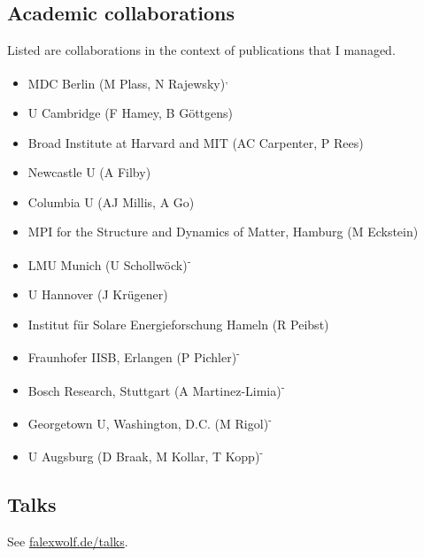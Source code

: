\subsection*{Academic collaborations}
Listed are collaborations in the context of publications that I managed. 
\begin{itemize}
\item MDC Berlin (M Plass, N Rajewsky)\textsuperscript{,}
\item U Cambridge (F Hamey, B Göttgens)
\item Broad Institute at Harvard and MIT (AC Carpenter, P Rees)
\item Newcastle U (A Filby)
\item Columbia U (AJ Millis, A Go)
\item MPI for the Structure and Dynamics of Matter, Hamburg (M Eckstein)
\item LMU Munich (U Schollwöck)\textsuperscript{-}
\item U Hannover (J Krügener)
\item Institut für Solare Energieforschung Hameln (R Peibst)
\item Fraunhofer IISB, Erlangen (P Pichler)\textsuperscript{-}
\item Bosch Research, Stuttgart (A Martinez-Limia)\textsuperscript{-}
\item Georgetown U, Washington, D.C. (M Rigol)\textsuperscript{-}
\item U Augsburg (D Braak, M Kollar, T Kopp)\textsuperscript{-}
\end{itemize}


\subsection*{Talks}
See \href{http://falexwolf.de/talks/}{falexwolf.de/talks}.
